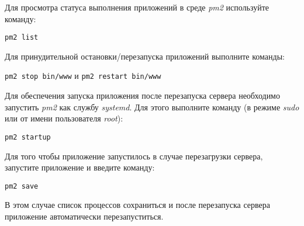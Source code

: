 	Для просмотра статуса выполнения приложений в среде \textit{pm2} используйте команду:
	
	\verb|pm2 list|
	
	Для принудительной остановки/перезапуска приложений выполните команды:
	
	\verb|pm2 stop bin/www| и \verb|pm2 restart bin/www|
	
	Для обеспечения запуска приложения после перезапуска сервера необходимо запустить \textit{pm2} как службу \textit{systemd}. Для этого выполните команду (в режиме \textit{sudo} или от имени пользователя \textit{root}):
	
	\verb|pm2 startup |
	
	Для того чтобы приложение запустилось в случае перезагрузки сервера, запустите приложение  и введите команду:
	
	\verb|pm2 save|
	
	В этом случае список процессов сохраниться и после перезапуска сервера приложение автоматически перезапуститься. 